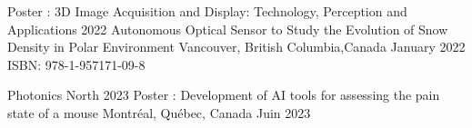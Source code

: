 


\begin{cventries}

  \cventry
    {Poster : 3D Image Acquisition and Display: Technology, Perception and Applications 2022} %
    {Autonomous Optical Sensor to Study the Evolution of Snow Density in Polar Environment} %
    {Vancouver, British Columbia,Canada} %
    {January 2022} %
    {ISBN: 978-1-957171-09-8
    }

    \cventry
    {Photonics North 2023} %
    {Poster : Development of AI tools for assessing the pain state of a mouse} %
    {Montréal, Québec, Canada} %
    {Juin 2023} %
    {}
\end{cventries}

